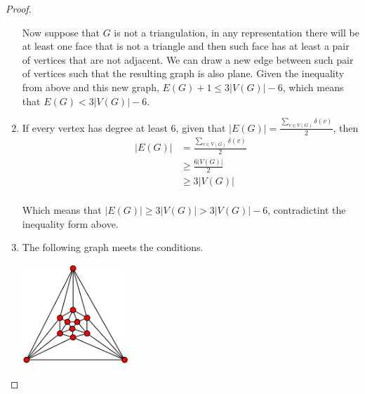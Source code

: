 \begin{proof}
\begin{enumerate}[label=(\roman*)]
            Now suppose that $G$ is not a triangulation, in any representation there will be at least one face that is
            not a triangle and then such face has at least a pair of vertices that are not adjacent. We can draw a new edge
            between such pair of vertices such that the resulting graph is also plane. Given the inequality from above and
            this new graph, $E(G) + 1 \leq 3|V(G)| - 6$, which means that $E(G) < 3|V(G)| - 6$.\pn
            
        \item
            If every vertex has degree at least $6$, given that $|E(G)| = \frac{\sum_{v \in V(G)} \delta(v)}{2}$, then
            \begin{align}
                |E(G)|      &=      \frac{\sum_{v \in V(G)} \delta(v)}{2}     \\
                            &\geq   \frac{6 |V(G)|}{2}                        \\                        
                            &\geq   3 |V(G)|                                  \\                        
            \end{align}
            
            Which means that $|E(G)| \geq 3 |V(G)| > 3 |V(G)| - 6$, contradictint the inequality form above.\pn
            
            
        \item
            The following graph meets the conditions.\pn
            \begin{center}
                \includegraphics[width=4cm]{Test3/Problem4/Icosahedron_graph.png}
            \end{center}\pn            
    \end{enumerate}    
\end{proof}